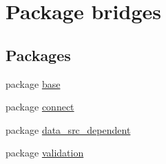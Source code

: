 \hypertarget{namespacebridges}{}\section{Package bridges}
\label{namespacebridges}
\subsection*{Packages}
\begin{DoxyCompactItemize}
\item 
package \mbox{\hyperlink{namespacebridges_1_1base}{base}}
\item 
package \mbox{\hyperlink{namespacebridges_1_1connect}{connect}}
\item 
package \mbox{\hyperlink{namespacebridges_1_1data__src__dependent}{data\+\_\+src\+\_\+dependent}}
\item 
package \mbox{\hyperlink{namespacebridges_1_1validation}{validation}}
\end{DoxyCompactItemize}
